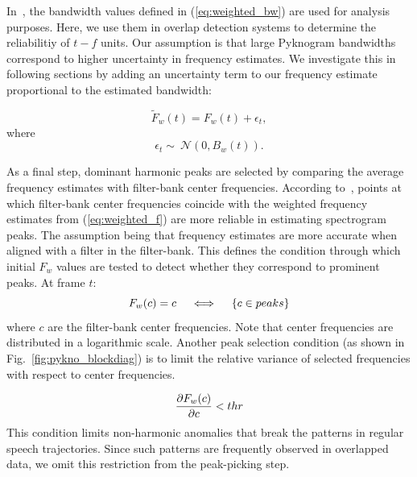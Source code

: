 {In~\cite{potamianos_maragos_jasa96}, the bandwidth values defined in (\ref{eq:weighted_bw}) are used for analysis purposes. 
Here, we use them in overlap detection systems to determine the reliabilitiy of $t-f$ units. 
Our assumption is that large Pyknogram bandwidths correspond to higher uncertainty in frequency estimates. 
We investigate this in following sections by adding an uncertainty term to our frequency estimate proportional to the estimated bandwidth:



\begin{equation}
\label{eq:jitter_f}
\tilde F_w(t) = F_w(t) + \epsilon_t,
\end{equation}
where
\begin{equation}
\label{eq:jitter_pdf}
\epsilon_t \sim\ \mathcal{N}(0,B_w(t)).
\end{equation}

As a final step, dominant harmonic peaks are selected by comparing the average frequency estimates with filter-bank center frequencies. 
According to~\cite{potamianos_maragos_jasa96}, points at which filter-bank center frequencies coincide with the weighted frequency estimates from (\ref{eq:weighted_f}) are more reliable in estimating spectrogram peaks. 
The assumption being that frequency estimates are more accurate when aligned with a filter in the filter-bank. 
This defines the condition through which initial $F_w$ values are tested to detect whether they correspond to prominent peaks. At frame $t$: 
\vspace{0mm}
\begin{equation}
\label{eq:RF1}
F_w(c) = c  \quad \iff \quad \{c \in peaks\}
\vspace{1mm}
\end{equation}
where $c$ are the filter-bank center frequencies. 
Note that center frequencies are distributed in a logarithmic scale. 
Another peak selection condition (as shown in Fig.~\ref{fig:pykno_blockdiag}) is to limit the relative variance of selected frequencies with respect to center frequencies. 

\begin{equation}
\label{eq:RF1}
\frac{\partial F_w(c)}{\partial c} < thr
\vspace{1mm}
\end{equation}
This condition limits non-harmonic anomalies that break the patterns in regular speech trajectories. 
Since such patterns are frequently observed in overlapped data, we omit this restriction from the peak-picking step.  

}
